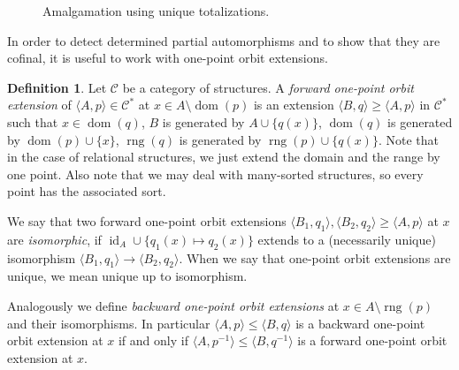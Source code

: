 \documentclass[10pt,a4paper]{article}
\theoremstyle{definition}
\newtheorem{df}[tw]{Definition}
\theoremstyle{remark}
\newcommand \set [1]{\{#1\}}
\newcommand \seq [1]{\langle #1 \rangle}
\newcommand \restr [1] {\mathord{\upharpoonright}_{#1}}
\newcommand \id [1]{{\operatorname{id}_{#1}}}
\newcommand \dom {\operatorname{dom}}
\newcommand \rng {\operatorname{rng}}
\newcommand \C {\mathscr{C}}
\begin{document}
\begin{figure}[!ht]
    \centering
{}
    \caption{Amalgamation using unique totalizations.}
    \label{fig:amalgamation_from_totalization}
\end{figure}


In order to detect determined partial automorphisms and to show that they are cofinal, it is useful to work with one-point orbit extensions.

\begin{df}
Let $\C$ be a category of structures.
A \emph{forward one-point orbit extension} of $\seq{A, p} \in \C^*$ at $x \in A \setminus \dom(p)$ is an extension $\seq{B, q} \geq \seq{A, p}$ in $\C^*$ such that $x \in \dom(q)$, $B$ is generated by $A \cup \set{q(x)}$, $\dom(q)$ is generated by $\dom(p) \cup \set{x}$, $\rng(q)$ is generated by $\rng(p) \cup \set{q(x)}$.
Note that in the case of relational structures, we just extend the domain and the range by one point.
Also note that we may deal with many-sorted structures, so every point has the associated sort.

We say that two forward one-point orbit extensions $\seq{B_1, q_1}, \seq{B_2, q_2} \geq \seq{A, p}$ at $x$ are {\it isomorphic}, if $\id{A} \cup \{q_1(x) \mapsto q_2(x)\}$ extends to a (necessarily unique) isomorphism $\seq{B_1, q_1} \to \seq{B_2, q_2}$.
When we say that one-point orbit extensions are unique, we mean unique up to isomorphism.

Analogously we define \emph{backward one-point orbit extensions} at $x \in A \setminus \rng(p)$ and their isomorphisms.
In particular $\seq{A, p} \leq \seq{B, q}$ is a backward one-point orbit extension at $x$ if and only if $\seq{A, p^{-1}} \leq \seq{B, q^{-1}}$ is a forward one-point orbit extension at $x$.
\end{df}
\end{document}
